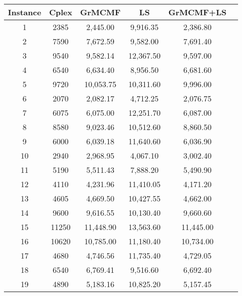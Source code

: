 \begin{table} \small
\centering
\begin{tabular}{cccccc}
\hline
 Instance & Cplex &  GrMCMF & LS  & GrMCMF+LS  \\\hline

1 &  2385 & 2,445.00 & 9,916.35 & 2,386.80 \\

2 & 7590 & 7,672.59 & 9,582.00 & 7,691.40 \\

3 & 9540 & 9,582.14 & 12,367.50 &  9,597.00  \\

4 & 6540 & 6,634.40 & 8,956.50 & 6,681.60 \\

5 & 9720 & 10,053.75 & 10,311.60 & 9,996.00 \\

6 & 2070 & 2,082.17 & 4,712.25 & 2,076.75 \\

7 & 6075 & 6,075.00 & 12,251.70 & 6,087.00 \\

8 & 8580 & 9,023.46 & 10,512.60 & 8,860.50 \\

9 & 6000 & 6,039.18 & 11,640.60 & 6,036.90 \\

10 & 2940 & 2,968.95 & 4,067.10 & 3,002.40 \\

11 &  5190	& 5,511.43 & 7,888.20 & 5,490.90 \\

12 &  4110	& 4,231.96 & 11,410.05 & 4,171.20 \\

13 &  4605 & 4,669.50 & 10,427.55 & 4,662.00 \\

14 &  9600	& 9,616.55 &  10,130.40 & 9,660.60 \\

15 & 11250 & 11,448.90 & 13,563.60 & 11,445.00 \\

16 &  10620	& 10,785.00 & 11,180.40& 10,734.00 \\

17 &  4680	&  4,746.56 & 11,735.40 & 4,729.05 \\

18 &   6540	&  6,769.41 & 9,516.60 & 6,692.40 \\

19 &  4890 	& 5,183.16 & 10,825.20 & 5,157.45 \\


\end{tabular}
\end{table}
